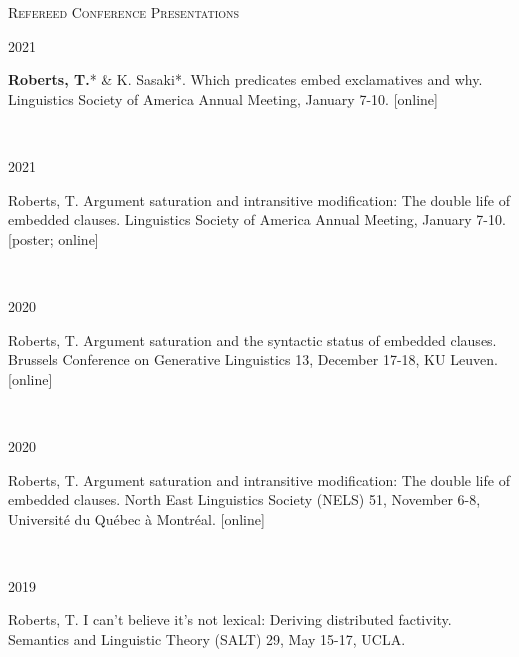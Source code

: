 \documentclass[12pt]{article} %
\begin{document}
\textsc{Refereed Conference Presentations}\\


\begin{minipage}[t]{3cm}
	2021
\end{minipage}
\begin{minipage}[t]{\smallertextwidth}
	\textbf{Roberts, T.}* \& K. Sasaki*. Which predicates embed exclamatives and why. Linguistics Society of America Annual Meeting, January 7-10. [online]  \end{minipage}\\

\begin{minipage}[t]{3cm}
	2021
\end{minipage}
\begin{minipage}[t]{\smallertextwidth}
	Roberts, T. Argument saturation and intransitive modification: The double life of embedded clauses. Linguistics Society of America Annual Meeting, January 7-10. [poster; online] \end{minipage}\\

\begin{minipage}[t]{3cm}
	2020
\end{minipage}
\begin{minipage}[t]{\smallertextwidth}
	Roberts, T. Argument saturation and the syntactic status of embedded clauses. Brussels Conference on Generative Linguistics 13, December 17-18, KU Leuven. [online]  \end{minipage}\\

\begin{minipage}[t]{3cm}
	2020
\end{minipage}
\begin{minipage}[t]{\smallertextwidth}
	Roberts, T. Argument saturation and intransitive modification: The double life of embedded clauses. North East Linguistics Society (NELS) 51, November 6-8, Université du Québec à Montréal. [online]  \end{minipage}\\


\begin{minipage}[t]{3cm}
2019
\end{minipage}
\begin{minipage}[t]{\smallertextwidth}
Roberts, T. I can't believe it's not lexical: Deriving distributed factivity. Semantics and Linguistic Theory (SALT) 29, May 15-17, UCLA. \end{minipage}\\
\end{document}
